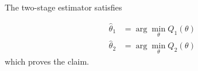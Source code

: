 \documentclass[article]{jss}
\begin{document}
The two-stage estimator satisfies

\begin{align}
\hat{\theta}_1 &= \arg\min_{\theta} Q_1(\theta) \\
\hat{\theta}_2 &= \arg\min_{\theta} Q_2(\theta)
\end{align}
which proves the claim.
\end{document}
